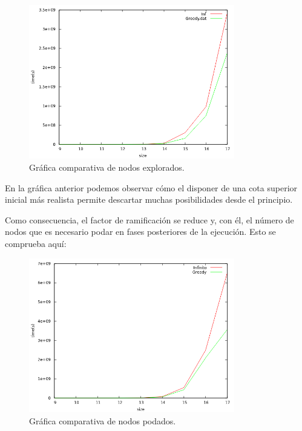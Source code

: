 \documentclass[11pt,a4paper]{article}
\begin{document}
			\begin{figure}[h]

				\centering
				\includegraphics[width=0.8\textwidth]{ComparativaExploradosInf-Greedy.png}
				\caption{Gráfica comparativa de nodos explorados.}
				
			\end{figure}

			\vspace{2mm}

			\par
			En la gráfica anterior podemos observar cómo el disponer de una cota superior inicial más realista permite descartar muchas posibilidades desde el principio.

\newpage

			\par
			Como consecuencia, el factor de ramificación se reduce y, con él, el número de nodos que es necesario podar en fases posteriores de la ejecución. Esto se comprueba aquí:

			\vspace{2mm}

			\begin{figure}[h]

				\centering
				\includegraphics[width=0.8\textwidth]{ComparativaPodadosInf-Greedy.png}
				\caption{Gráfica comparativa de nodos podados.}
				
			\end{figure}
\end{document}
